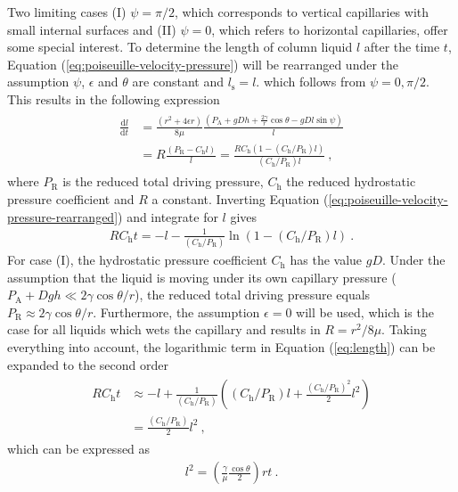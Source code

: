 \documentclass[aip, amsmath, amssymb, reprint, twocolumn, floatfix]{revtex4-1}
\newcommand{\dldt}{\frac{\mathrm{d}l}{\mathrm{d}t}}
\newcommand{\Pa}{P_\mathrm{A}}
\newcommand{\Ptr}{P_\mathrm{R}}
\newcommand{\Phr}{C_\mathrm{h}}
\newcommand{\ls}{l_\mathrm{s}}
\begin{document}
Two limiting cases (I) $\psi = \pi/2$, which corresponds to vertical capillaries with small internal surfaces and (II) $\psi = 0$, which refers to horizontal capillaries, offer some special interest.
To determine the length of column liquid $l$ after the time $t$, Equation (\ref{eq:poiseuille-velocity-pressure}) will be rearranged under the assumption $\psi$, $\epsilon$ and $\theta$ are constant and $\ls = l$. which follows from $\psi = 0, \pi/2$. This results in the following expression
\begin{gather}
	\begin{aligned}
		\dldt &= \frac{\left(r^2 + 4\epsilon r \right)}{8\mu}\frac{\left(\Pa + gDh + \frac{2\gamma}{r}\cos \theta - gDl \sin \psi \right)}{l}\\
			  &= R \frac{\left(\Ptr - \Phr l\right)}{l} = \frac{R \Phr \left( 1 - (\Phr/\Ptr) l\right)}{(\Phr/\Ptr) l}~,
	\end{aligned}
	\label{eq:poiseuille-velocity-pressure-rearranged}
\end{gather}
where $\Ptr$ is the reduced total driving pressure, $\Phr$ the reduced hydrostatic pressure coefficient and $R$ a constant. Inverting Equation (\ref{eq:poiseuille-velocity-pressure-rearranged}) and integrate for $l$ gives
\begin{gather}
	R \Phr t = - l - \frac{1}{(\Phr/\Ptr)} \ln\left(1- (\Phr/\Ptr) l \right)~.
	\label{eq:length}
\end{gather}
For case (I), the hydrostatic pressure coefficient $\Phr$ has the value $gD$. Under the assumption that the liquid is moving under its own capillary pressure ($\Pa + Dgh \ll  2\gamma\cos\theta/r$), the reduced total driving pressure equals $\Ptr \approx 2\gamma\cos\theta/r$. Furthermore, the assumption $\epsilon = 0$ will be used, which is the case for all liquids which wets the capillary and results in $R = r^2/8\mu$. Taking everything into account, the logarithmic term in Equation (\ref{eq:length}) can be expanded to the second order
\begin{gather}
	\begin{aligned}
		R \Phr t &\approx - l + \frac{1}{(\Phr/\Ptr)} \left((\Phr/\Ptr) l + \frac{(\Phr/\Ptr)^2}{2} l^2 \right) \\
				  &= \frac{(\Phr/\Ptr)}{2} l^2~,
	\end{aligned}
	\label{eq:length-expanded}
\end{gather}
which can be expressed as
\begin{gather}
	\boxed{l^2 = \left(\frac{\gamma}{\mu}\frac{\cos \theta}{2}\right)rt}~.
	\label{eq:BCLW-Imbibition}
\end{gather}
\end{document}
